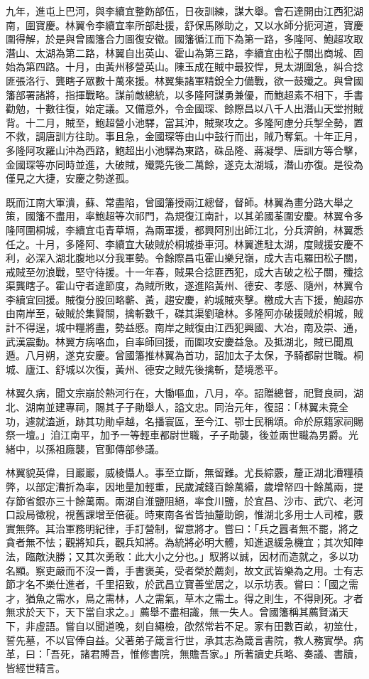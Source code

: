 \begin{pinyinscope}
九年，進屯上巴河，與李續宜整飭部伍，日夜訓練，謀大舉。會石達開由江西犯湖南，圍寶慶。林翼令李續宜率所部赴援，舒保馬隊助之，又以水師分扼河道，寶慶圍得解，於是與曾國籓合力圖復安徽。國籓循江而下為第一路，多隆阿、鮑超攻取潛山、太湖為第二路，林翼自出英山、霍山為第三路，李續宜由松子關出商城、固始為第四路。十月，由黃州移營英山。陳玉成在賊中最狡悍，見太湖圍急，糾合捻匪張洛行、龔瞎子眾數十萬來援。林翼集諸軍精銳全力備戰，欲一鼓殲之。與曾國籓部署諸將，指揮戰略。謀前敵總統，以多隆阿謀勇兼優，而鮑超素不相下，手書勸勉，十數往復，始定議。又備意外，令金國琛、餘際昌以八千人出潛山天堂拊賊背。十二月，賊至，鮑超營小池驛，當其沖，賊聚攻之。多隆阿慮分兵掣全勢，置不救，調唐訓方往助。事且急，金國琛等由山中鼓行而出，賊乃奪氣。十年正月，多隆阿攻羅山沖為西路，鮑超出小池驛為東路，硃品隆、蔣凝學、唐訓方等合擊，金國琛等亦同時並進，大破賊，殲斃先後二萬餘，遂克太湖城，潛山亦復。是役為僅見之大捷，安慶之勢遂孤。

既而江南大軍潰，蘇、常盡陷，曾國籓授兩江總督，督師。林翼為畫分路大舉之策，國籓不盡用，率鮑超等次祁門，為規復江南計，以其弟國荃圍安慶。林翼令多隆阿圍桐城，李續宜屯青草塥，為兩軍援，都興阿別出師江北，分兵濟餉，林翼悉任之。十月，多隆阿、李續宜大破賊於桐城掛車河。林翼進駐太湖，度賊援安慶不利，必深入湖北腹地以分我軍勢。令餘際昌屯霍山樂兒嶺，成大吉屯羅田松子關，戒賊至勿浪戰，堅守待援。十一年春，賊果合捻匪西犯，成大吉破之松子關，殲捻渠龔瞎子。霍山守者違節度，為賊所敗，遂進陷黃州、德安、孝感、隨州，林翼令李續宜回援。賊復分股回略蘄、黃，趨安慶，約城賊夾擊。檄成大吉下援，鮑超亦由南岸至，破賊於集賢關，擒斬數千，磔其渠劉瑲林。多隆阿亦破援賊於桐城，賊計不得逞，城中糧將盡，勢益慼。南岸之賊復由江西犯興國、大冶，南及崇、通，武漢震動。林翼方病咯血，自率師回援，而圍攻安慶益急。及抵湖北，賊已聞風遁。八月朔，遂克安慶。曾國籓推林翼為首功，詔加太子太保，予騎都尉世職。桐城、廬江、舒城以次復，黃州、德安之賊先後擒斬，楚境悉平。

林翼久病，聞文宗崩於熱河行在，大慟嘔血，八月，卒。詔贈總督，祀賢良祠，湖北、湖南並建專祠，賜其子子勛舉人，謚文忠。同治元年，復詔：「林翼未竟全功，遽就溘逝，跡其功勛卓越，名播寰區，至今江、鄂士民稱頌。命於原籍家祠賜祭一壇。」洎江南平，加予一等輕車都尉世職，子子勛襲，後並兩世職為男爵。光緒中，以孫祖廕襲，官郵傳部參議。

林翼貌英偉，目巖巖，威棱懾人。事至立斷，無留難。尤長綜覈，釐正湖北漕糧積弊，以部定漕折為率，因地量加輕重，民歲減錢百餘萬緡，歲增帑四十餘萬兩，提存節省銀亦三十餘萬兩。兩湖自淮鹽阻絕，率食川鹽，於宜昌、沙市、武穴、老河口設局徵稅，視舊課增至倍蓰。時東南各省皆抽釐助餉，惟湖北多用士人司榷，覈實無弊。其治軍務明紀律，手訂營制，留意將才。嘗曰：「兵之囂者無不罷，將之貪者無不怯；觀將知兵，觀兵知將。為統將必明大體，知進退緩急機宜；其次知陣法，臨敵決勝；又其次勇敢：此大小之分也。」馭將以誠，因材而造就之，多以功名顯。察吏嚴而不沒一善，手書褒美，受者榮於薦剡，故文武皆樂為之用。士有志節才名不樂仕進者，千里招致，於武昌立寶善堂居之，以示坊表。嘗曰：「國之需才，猶魚之需水，鳥之需林，人之需氣，草木之需土。得之則生，不得則死。才者無求於天下，天下當自求之。」薦舉不盡相識，無一失人。曾國籓稱其薦賢滿天下，非虛語。嘗自以聞道晚，刻自繩檢，欿然常若不足。家有田數百畝，初筮仕，誓先墓，不以官俸自益。父著弟子箴言行世，承其志為箴言書院，教人務實學。病革，曰：「吾死，諸君賻吾，惟修書院，無贍吾家。」所著讀史兵略、奏議、書牘，皆經世精言。


\end{pinyinscope}

